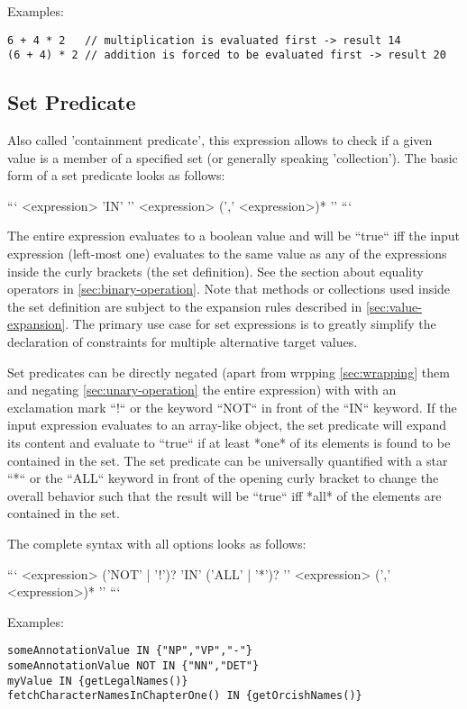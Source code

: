 \documentclass[11pt]{article}
\begin{document}
Examples:

\begin{verbatim}
6 + 4 * 2   // multiplication is evaluated first -> result 14
(6 + 4) * 2 // addition is forced to be evaluated first -> result 20
\end{verbatim}

\subsection{Set Predicate}
\label{sec:set-predicate}

Also called 'containment predicate', this expression allows to check if a given value is a member of a specified set (or generally speaking 'collection'). The basic form of a set predicate looks as follows:

```
<expression> 'IN' '{' <expression> (',' <expression>)* '}' 
```

The entire expression evaluates to a boolean value and will be ``true`` iff the input expression (left-most one) evaluates to the same value as any of the expressions inside the curly brackets (the set definition). See the section about equality operators in \cref{sec:binary-operation}. Note that methods or collections used inside the set definition are subject to the expansion rules described in \cref{sec:value-expansion}. The primary use case for set expressions is to greatly simplify the declaration of constraints for multiple alternative target values. 

Set predicates can be directly negated (apart from wrpping \cref{sec:wrapping} them and negating \cref{sec:unary-operation} the entire expression) with with an exclamation mark ``!`` or the keyword ``NOT`` in front of the ``IN`` keyword. If the input expression evaluates to an array-like object, the set predicate will expand its content and evaluate to ``true`` if at least *one* of its elements is found to be contained in the set. The set predicate can be universally quantified with a star ``*`` or the ``ALL`` keyword in front of the opening curly bracket to change the overall behavior such that the result will be ``true`` iff *all* of the elements are contained in the set.

The complete syntax with all options looks as follows: 

```
<expression> ('NOT' | '!')? 'IN' ('ALL' | '*')? '{' <expression> (',' <expression>)* '}' 
```

Examples:

\begin{verbatim}
someAnnotationValue IN {"NP","VP","-"}
someAnnotationValue NOT IN {"NN","DET"}
myValue IN {getLegalNames()}
fetchCharacterNamesInChapterOne() IN {getOrcishNames()}
\end{verbatim}
\end{document}
